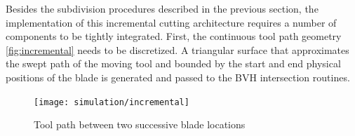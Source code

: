 
Besides the subdivision procedures described in the previous section, the implementation of this incremental cutting architecture requires a number of components to be tightly integrated. First, the continuous tool path geometry \eg \autoref{fig:incremental} needs to be discretized. A triangular surface that approximates the swept path of the moving tool and bounded by the start and end physical positions of the blade is generated and passed to the BVH intersection routines.

\begin{figure}
	\centering%
	\texttt{[image: simulation/incremental]}
	\caption{Tool path between two successive blade locations}
	\label{fig:incremental}
\end{figure}



